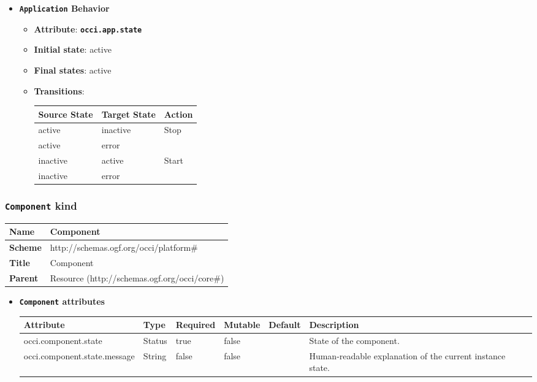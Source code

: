 \begin{itemize}
\item \textbf{\texttt{Application} Behavior}
\begin{itemize}
\item \textbf{Attribute}: \textbf{\texttt{occi.app.state}}
\item \textbf{Initial state}: active
\item \textbf{Final states}:  	active
\item \textbf{Transitions}:

\begin{center}
\begin{tabular}{|l|l|l|}
  \hline
  \textbf{Source State} & \textbf{Target State} & \textbf{Action} \\
  \hline  
  active & inactive & Stop  \\
  \hline
  active & error &   \\
  \hline
  inactive & active & Start  \\
  \hline
  inactive & error &   \\
  \hline
\end{tabular}
\end{center}
\end{itemize}
\end{itemize}

\subsubsection{\texttt{Component} kind}
\begin{center}
\begin{tabular}{|l|l|}
  \hline
  \textbf{Name} & Component \\
  \hline  
  \textbf{Scheme} & http://schemas.ogf.org/occi/platform\# \\
  \hline
  \textbf{Title} & Component \\
  \hline
  \textbf{Parent} & Resource (http://schemas.ogf.org/occi/core\#) \\
  \hline
\end{tabular}
\end{center}
\begin{itemize}
\item \textbf{\texttt{Component} attributes}

\begin{tabularx}{\textwidth}{|l|l|p{1.4cm}|p{1.3cm}|l|X|}
  \hline
  \textbf{Attribute} & \textbf{Type} & \textbf{Required} & \textbf{Mutable} & \textbf{Default} & \textbf{Description} \\
  \hline  
  occi.component.state & Status & true & false &  & State of the component. \\
  \hline
  occi.component.state.message & String & false & false &  & Human-readable explanation of the current instance state. \\
  \hline
\end{tabularx}
\end{itemize}

